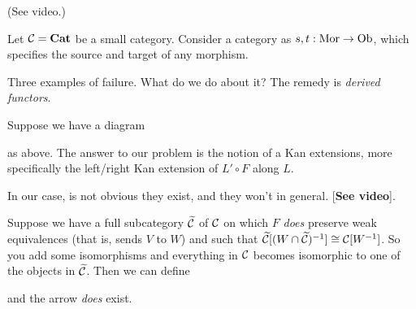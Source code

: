 \documentclass[class=report, crop=false,a4paper,twoside]{standalone}
\begin{document}
\begin{example}[(Limits)]

		

		

	(See video.)
\end{example}

\begin{example}
	Let $\mathcal{C} = \mathbf{Cat}$ be a small category. Consider a category as $s,t: \operatorname{Mor} \to \operatorname{Ob}$, which specifies the source and target of any morphism.

	
		
\end{example}

Three examples of failure. What do we do about it? The remedy is \emph{derived functors}. 

Suppose we have a diagram
\begin{center}
\end{center}
as above. The answer to our problem is the notion of a Kan extensions, more specifically the left/right Kan extension of $L' \circ F$ along $L$. 

\begin{minipage}[t]{0.5\textwidth}
\begin{definition}
	
\end{definition}
\end{minipage}
\begin{minipage}[t]{0.5\textwidth}
\begin{definition}
	
\end{definition}
\end{minipage}

In our case, is not obvious they exist, and they won't in general. [\textbf{See video}]. 

Suppose we have a full subcategory $\widetilde{\mathcal{C}}$ of $\mathcal{C}$ on which $F$ \emph{does} preserve weak equivalences (that is, sends $V$ to $W$) and such that $\widetilde{\mathcal{C}}[(W \cap \widetilde{\mathcal{C}})^{-1}] \cong \mathcal{C}[W^{-1}]$. So you add some isomorphisms and everything in $\mathcal{C}$ becomes isomorphic to one of the objects in $\widetilde{\mathcal{C}}$. Then we can define
\begin{center}
\end{center}
and the arrow \emph{does} exist. 
\end{document}

